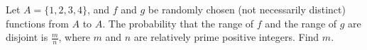 Let $A=\{1,2,3,4\}$,  and $f$ and $g$ be randomly chosen (not necessarily distinct) functions from $A$ to $A$. The probability that the range of $f$ and the range of $g$ are disjoint is $\tfrac{m}{n}$,  where $m$ and $n$ are relatively prime positive integers. Find $m$.